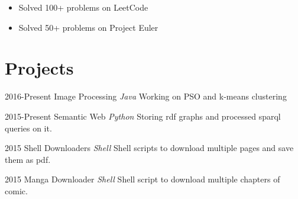 \documentclass[]{friggeri-cv-a4}
\begin{document}
\begin{itemize}
\item Solved 100+ problems on LeetCode
\item Solved 50+ problems on Project Euler
\end{itemize}








\section{\normalfont Projects}

\begin{entrylist}

\entry
{2016-Present}
{Image Processing}
{\emph{Java}}
{Working on PSO and k-means clustering}

\entry
{2015-Present}
{Semantic Web}
{\emph{Python}}
{Storing rdf graphs and processed sparql queries on it.}


\entry
{2015}
{Shell Downloaders}
{\emph{Shell}}
{Shell scripts to download multiple pages and save them as pdf.}

\entry
{2015}
{Manga Downloader}
{\emph{Shell}}
{Shell script to download multiple chapters of comic.}

\end{entrylist}
\end{document}
